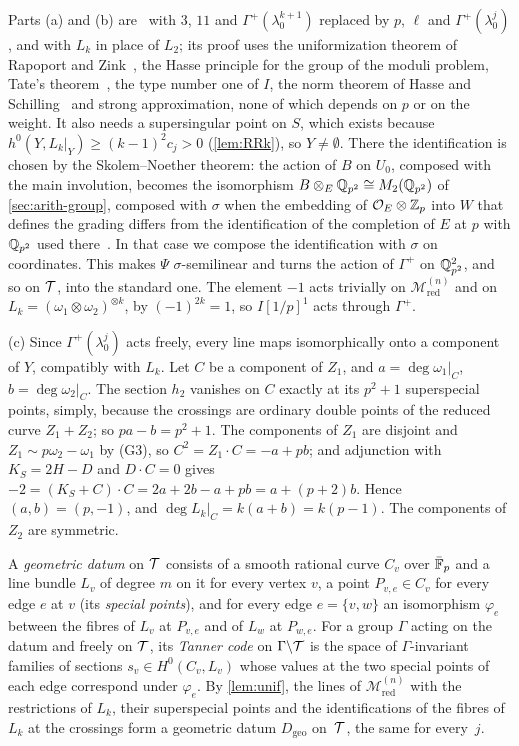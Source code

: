 \begin{informalproof}
Parts (a) and (b) are~\cite[Lemma~6.6]{Luck2026} with $3$, $11$ and $\Gamma^+(\lambda_0^{k+1})$ replaced by $p$, $\ell$ and
$\Gamma^+(\lambda_0^j)$, and with $L_k$ in place of $L_2$; its proof uses the uniformization theorem of Rapoport and
Zink~\cite[Theorem~6.30]{RapoportZink1996}, the Hasse principle for the group of the moduli problem, Tate's
theorem~\cite{Tate1966}, the type number one of $I$, the norm theorem of Hasse and
Schilling~\cite[Theorem~III.4.1]{Vigneras1980} and strong approximation, none of which depends on $p$ or on the weight.
It also needs a supersingular point on $S$, which exists because $h^0(Y,L_k|_Y)\ge(k-1)^2c_j>0$ (\cref{lem:RRk}), so
$Y\ne\emptyset$. There the identification is chosen by the Skolem--Noether theorem: the action of $B$ on $U_0$, composed with the main
involution, becomes the isomorphism $B\otimes_E\mathbb{Q}_{p^2}\cong M_2(\mathbb{Q}_{p^2})$ of \cref{sec:arith-group}, composed with
$\sigma$ when the embedding of $\mathcal{O}_E\otimes\mathbb{Z}_p$ into $W$ that defines the grading differs from the identification of
the completion of $E$ at $p$ with $\mathbb{Q}_{p^2}$ used there~\cite[proof of Lemma~6.6(a)]{Luck2026}. In that case we compose
the identification with $\sigma$ on coordinates. This makes $\Psi$ $\sigma$-semilinear and turns the action of $\Gamma^+$
on $\mathbb{Q}_{p^2}^2$, and so on $\mathcal{T}$, into the standard one.
The element $-1$ acts trivially on $\mathcal M^{(n)}_{\mathrm{red}}$ and on $L_k=(\omega_1\otimes\omega_2)^{\otimes k}$,
by $(-1)^{2k}=1$, so $I[1/p]^1$ acts through $\Gamma^+$.

(c) Since $\Gamma^+(\lambda_0^j)$ acts freely, every line maps isomorphically onto a component of $Y$, compatibly
with $L_k$. Let $C$ be a component of $Z_1$, and $a=\deg\omega_1|_C$, $b=\deg\omega_2|_C$. The section $h_2$ vanishes on
$C$ exactly at its $p^2+1$ superspecial points, simply, because the crossings are ordinary double points of the reduced
curve $Z_1+Z_2$; so $pa-b=p^2+1$. The components of $Z_1$ are disjoint and $Z_1\sim p\omega_2-\omega_1$ by (G3), so
$C^2=Z_1\cdot C=-a+pb$; and adjunction with $K_S=2H-D$ and $D\cdot C=0$ gives
$-2=(K_S+C)\cdot C=2a+2b-a+pb=a+(p+2)b$. Hence $(a,b)=(p,-1)$, and $\deg L_k|_C=k(a+b)=k(p-1)$. The components of $Z_2$ are
symmetric.
\end{informalproof}

A \emph{geometric datum} on $\mathcal{T}$ consists of a smooth rational curve $C_v$ over $\bar{\mathbb{F}}_p$ and a line bundle $L_v$ of
degree $m$ on it for every vertex $v$, a point $P_{v,e}\in C_v$ for every edge $e$ at $v$ (its \emph{special points}), and
for every edge $e=\{v,w\}$ an isomorphism $\varphi_e$ between the fibres of $L_v$ at $P_{v,e}$ and of $L_w$ at $P_{w,e}$.
For a group $\Gamma$ acting on the datum and freely on $\mathcal{T}$, its \emph{Tanner code} on $\Gamma\backslash\mathcal{T}$ is the space of
$\Gamma$-invariant families of sections $s_v\in H^0(C_v,L_v)$ whose values at the two special points of each edge
correspond under $\varphi_e$. By \cref{lem:unif}, the lines of $\mathcal M^{(n)}_{\mathrm{red}}$ with the restrictions of
$L_k$, their superspecial points and the identifications of the fibres of $L_k$ at the crossings form a geometric datum
$D_{\mathrm{geo}}$ on~$\mathcal{T}$, the same for every~$j$.


